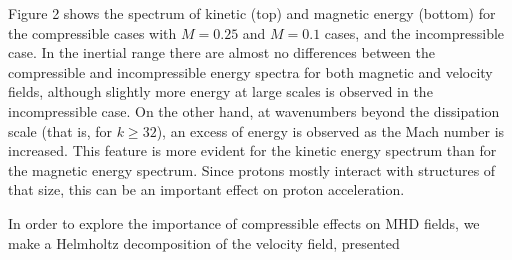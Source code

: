 \documentclass[%
aip,pop,amsmath,amssymb,
 reprint,%
]{revtex4-1}
\begin{document}
Figure 2 shows the spectrum of kinetic (top) and magnetic energy (bottom) for the 
compressible cases with $M=0.25$ and $M=0.1$ cases, and the
incompressible case. In the inertial range there are almost no differences between the 
compressible and incompressible energy spectra for 
both magnetic and velocity fields, although slightly more energy at 
large scales is observed in the incompressible case. On the other hand, at wavenumbers beyond
the dissipation scale (that is, for $k\geq32$),  an excess of energy is observed as the Mach
number is increased. This feature is more evident for the kinetic energy spectrum
than for the magnetic energy spectrum. Since protons mostly interact with structures
of that size, this can be an important effect on proton acceleration.



In order to explore the importance of compressible effects on MHD fields,
we make a Helmholtz decomposition of the velocity field, presented
\end{document}
